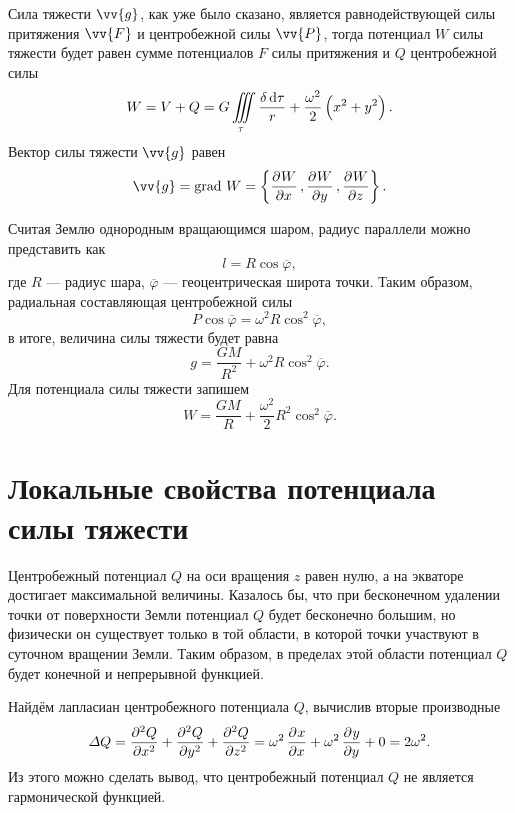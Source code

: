 \documentclass[11pt, a4paper]{article}
\theoremstyle{plain}
\theoremstyle{definition}
\theoremstyle{remark}
\renewcommand{\phi}{\ensuremath{\varphi}}
\begin{document}
Сила тяжести $\vv{g}$, как уже было сказано, является равнодействующей силы притяжения $\vv{F}$ и центробежной силы $\vv{P}$, тогда потенциал $W$ силы тяжести  будет равен сумме потенциалов $F$ силы притяжения  и $Q$ центробежной силы
\begin{equation*}
	W = V + Q = G \iiint \limits_{\tau} \dfrac{\delta \dif \tau}{r} +  \dfrac{\omega^2}{2} \left(x^2+y^2\right).
\end{equation*}
Вектор силы тяжести $\vv{g}$ равен
\begin{equation*}
	\vv{g} =  \text{grad } W = \left\lbrace \dpd{W}{x}, \dpd{W}{y}, \dpd{W}{z} \right\rbrace.
\end{equation*}

Считая Землю однородным вращающимся шаром, радиус параллели можно представить как
\begin{equation*}
	l = R \cos \overline{\phi}, 
\end{equation*}
где $R$ --- радиус шара, $\overline{\phi}$ --- геоцентрическая широта точки. Таким образом, радиальная составляющая центробежной силы
\begin{equation*}
	P \cos \overline{\phi} = \omega^2 R \cos^2 \overline{\phi}, 
\end{equation*}
в итоге, величина силы тяжести будет равна
\begin{equation*}
	g = \dfrac{GM}{R^2} + \omega^2 R \cos^2 \overline{\phi}. 
\end{equation*}
Для потенциала силы тяжести запишем
\begin{equation*}
	W = \dfrac{GM}{R} + \dfrac{\omega^2}{2} R^2 \cos^2 \overline{\phi}. 
\end{equation*}
\section{Локальные свойства потенциала силы тяжести}
Центробежный потенциал $Q$ на оси вращения $z$ равен нулю, а на экваторе достигает максимальной величины. Казалось бы, что при бесконечном удалении точки от поверхности Земли потенциал $Q$ будет бесконечно большим, но физически он существует только в той области, в которой точки участвуют в суточном вращении Земли. Таким образом, в пределах этой области потенциал $Q$ будет конечной и непрерывной функцией.

Найдём лапласиан центробежного потенциала $Q$, вычислив вторые производные
\begin{equation*}
	\Delta Q = \dpd[2]{Q}{x} + \dpd[2]{Q}{y} + \dpd[2]{Q}{z} = \omega^2\dpd{x}{x} + \omega^2\dpd{y}{y} + 0 = 2 \omega^2.
\end{equation*}
Из этого можно сделать вывод, что центробежный потенциал $Q$ не является гармонической функцией.
\end{document}
